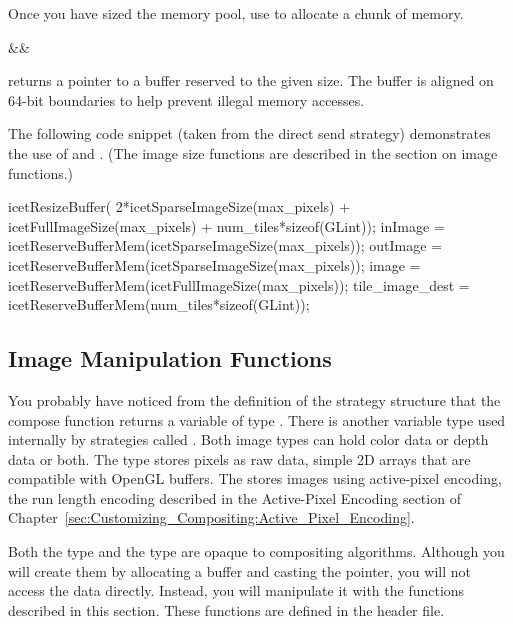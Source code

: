 \label{manpage:icetReserveBufferMem}
Once you have sized the memory pool, use  to
allocate a chunk of memory.

\begin{Table}{3}
  \textC{(}&&\quad\textC{);}
\end{Table}

 returns a pointer to a buffer reserved to the
given size.  The buffer is aligned on 64-bit boundaries to help prevent
illegal memory accesses.

The following code snippet (taken from the direct send strategy)
demonstrates the use of  and
.  (The image size functions are described in
the section on image functions.)

\begin{code}
    icetResizeBuffer(  2*icetSparseImageSize(max_pixels)
		     + icetFullImageSize(max_pixels)
		     + num_tiles*sizeof(GLint));
    inImage     = icetReserveBufferMem(icetSparseImageSize(max_pixels));
    outImage    = icetReserveBufferMem(icetSparseImageSize(max_pixels));
    image	= icetReserveBufferMem(icetFullImageSize(max_pixels));
    tile_image_dest = icetReserveBufferMem(num_tiles*sizeof(GLint));
\end{code}

\subsection{Image Manipulation Functions}

You probably have noticed from the definition of the strategy structure
that the compose function returns a variable of type .
There is another variable type used internally by strategies called
.  Both image types can hold color data or depth
data or both.  The  type stores pixels as raw data, simple
2D arrays that are compatible with OpenGL buffers.  The
 stores images using
active-pixel encoding, the run length encoding
described in the Active-Pixel Encoding section of
Chapter~\ref{sec:Customizing_Compositing:Active_Pixel_Encoding}.

Both the  type and the  type are
opaque to compositing algorithms.  Although you will create them by
allocating a buffer and casting the pointer, you will not access the data
directly.  Instead, you will manipulate it with the functions described in
this section.  These functions are defined in the
 header file.

